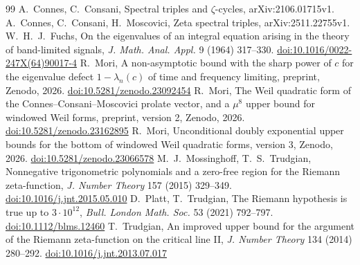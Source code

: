 \documentclass[11pt]{amsart}
\newcommand{\doi}[1]{\href{https://doi.org/#1}{doi:#1}}
\theoremstyle{remark}
\numberwithin{equation}{section}
\begin{document}
\begin{thebibliography}{99}
 A.~Connes, C.~Consani, Spectral triples and $\zeta$-cycles, arXiv:2106.01715v1.
 A.~Connes, C.~Consani, H.~Moscovici, Zeta spectral triples, arXiv:2511.22755v1.
 W.~H.~J.~Fuchs, On the eigenvalues of an integral equation arising in the theory of band-limited signals, \emph{J. Math. Anal. Appl.} 9 (1964) 317--330. \doi{10.1016/0022-247X(64)90017-4}
 R.~Mori, A non-asymptotic bound with the sharp power of $c$ for the eigenvalue defect $1-\lambda_n(c)$ of time and frequency limiting, preprint, Zenodo, 2026. \doi{10.5281/zenodo.23092454}
 R.~Mori, The Weil quadratic form of the Connes--Consani--Moscovici prolate vector, and a $\mu^8$ upper bound for windowed Weil forms, preprint, version 2, Zenodo, 2026. \doi{10.5281/zenodo.23162895}
 R.~Mori, Unconditional doubly exponential upper bounds for the bottom of windowed Weil quadratic forms, version 3, Zenodo, 2026. \doi{10.5281/zenodo.23066578}
 M.~J.~Mossinghoff, T.~S.~Trudgian, Nonnegative trigonometric polynomials and a zero-free region for the Riemann zeta-function, \emph{J. Number Theory} 157 (2015) 329--349. \doi{10.1016/j.jnt.2015.05.010}
 D.~Platt, T.~Trudgian, The Riemann hypothesis is true up to $3\cdot10^{12}$, \emph{Bull. London Math. Soc.} 53 (2021) 792--797. \doi{10.1112/blms.12460}
 T.~Trudgian, An improved upper bound for the argument of the Riemann zeta-function on the critical line II, \emph{J. Number Theory} 134 (2014) 280--292. \doi{10.1016/j.jnt.2013.07.017}
\end{thebibliography}
\end{document}
